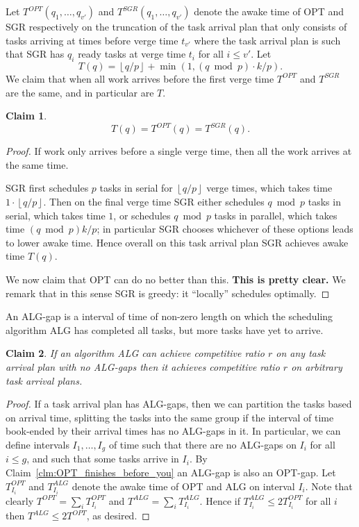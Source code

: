 \documentclass[twocolumn]{article}[10pt]
\newcommand{\floor}[1]{\left\lfloor #1 \right\rfloor}
\newtheorem{clm}{Claim}
\begin{document}
Let $T^{OPT}(q_1, \ldots, q_{v'})$ and $T^{SGR}(q_1, \ldots,
q_{v'})$ denote the awake time of OPT and SGR respectively on
the truncation of the task arrival plan that only consists of
tasks arriving at times before verge time $t_{v'}$ where the
task arrival plan is such that SGR has $q_i$ ready tasks at verge
time $t_i$ for all $i \le v'$. Let 
$$ T(q) = \floor{q/p} + \min(1, (q\bmod p)\cdot k/p). $$
We claim that when all work arrives before the first verge time
$T^{OPT}$ and $T^{SGR}$ are the same, and in particular are $T$.
\begin{clm}
  $$T(q) = T^{OPT}(q) = T^{SGR}(q).$$
\end{clm}
\begin{proof}
  If work only arrives before a single verge time, then all the
  work arrives at the same time. 

  SGR first schedules $p$ tasks in serial for $\floor{q/p}$
  verge times, which takes time $1\cdot \floor{q/p}$. Then on
  the final verge time SGR either schedules $q\bmod p$ tasks
  in serial, which takes time $1$, or schedules $q\bmod p$
  tasks in parallel, which takes time $(q\bmod p)k/p$; in
  particular SGR chooses whichever of these options leads to
  lower awake time. Hence overall on this task arrival plan
  SGR achieves awake time $T(q)$.

  We now claim that OPT can do no better than this. \textbf{This
  is pretty clear.} We remark that in this sense SGR is greedy: it
  \enquote{locally} schedules optimally. 

\end{proof}

An ALG-gap is a interval of time of non-zero length on which
the scheduling algorithm ALG has completed all tasks, but more
tasks have yet to arrive.
\begin{clm}
  \label{clm:just_consider_gapless}
  If an algorithm ALG can achieve competitive ratio $r$ on any
  task arrival plan with no ALG-gaps then it achieves
  competitive ratio $r$ on arbitrary task arrival plans.
\end{clm}
\begin{proof}
  If a task arrival plan has ALG-gaps, then we can partition the
  tasks based on arrival time, splitting the tasks into the same
  group if the interval of time book-ended by their arrival times
  has no ALG-gaps in it. In particular, we can define intervals
  $I_1, \ldots, I_g$ of time such that there are no ALG-gaps on
  $I_i$ for all $i\le g$, and such that some tasks arrive in $I_i$.
  By Claim~\ref{clm:OPT_finishes_before_you} an ALG-gap is also an
  OPT-gap. 
  Let $T_{I_i}^{OPT}$ and $T_{I_i}^{ALG}$ denote the awake time
  of OPT and ALG on interval $I_i$. Note that clearly
  $T^{OPT} = \sum_{i} T_{I_i}^{OPT}$ and $T^{ALG} = \sum_{i}
  T_{I_i}^{ALG}$. Hence if $T_{I_i}^{ALG} \le 2T_{I_i}^{OPT}$ for
  all $i$ then $T^{ALG} \le 2T^{OPT}$, as desired.
  
\end{proof}
\end{document}
